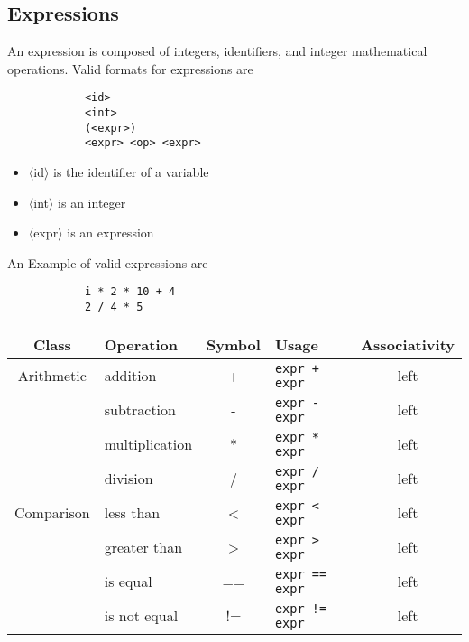 \documentclass{article}
\begin{document}
	
	\subsection{Expressions}

		An expression is composed of integers, identifiers, and integer mathematical operations.  Valid formats for
		expressions are

		\begin{lstlisting}
			<id>
			<int>
			(<expr>)
			<expr> <op> <expr>
		\end{lstlisting}

		\begin{itemize}
			\item{$\langle$id$\rangle$} is the identifier of a variable
			\item{$\langle$int$\rangle$} is an integer
			\item{$\langle$expr$\rangle$} is an expression
		\end{itemize}
		
		An Example of valid expressions are

		\begin{lstlisting}
			i * 2 * 10 + 4
			2 / 4 * 5
		\end{lstlisting}
		
		\begin{center}
			\begin{tabular}{|c|l|c|l|c|}
				\hline
				\textbf{Class} & \textbf{Operation} & \textbf{Symbol} & \textbf{Usage} &
				\textbf{Associativity} \\
				\hline
				Arithmetic 
				&addition	    & + & \texttt{expr + expr} & left \\
				&subtraction    & - & \texttt{expr - expr} & left \\
				&multiplication & * & \texttt{expr * expr} & left \\
				&division       & / & \texttt{expr / expr} & left \\
				\hline
				Comparison
				&less than      & <  & \texttt{expr < expr}  & left \\
				&greater than   & >  & \texttt{expr > expr}  & left \\
				&is equal       & == & \texttt{expr == expr} & left \\
				&is not equal   & != & \texttt{expr != expr} & left \\
				\hline
			\end{tabular}
		\end{center}
		
\end{document}
